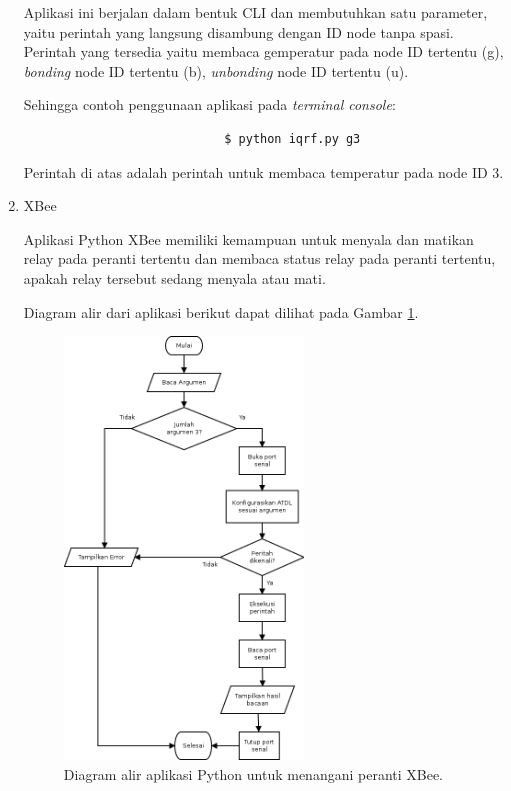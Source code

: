 \begin{enumerate}
					Aplikasi ini berjalan dalam bentuk CLI dan membutuhkan satu parameter, yaitu perintah yang langsung disambung dengan ID node tanpa spasi. Perintah yang tersedia yaitu membaca gemperatur pada node ID tertentu (g), \emph{bonding} node ID tertentu (b), \emph{unbonding} node ID tertentu (u).

					Sehingga contoh penggunaan aplikasi pada \emph{terminal console}:
					\begingroup
					    \fontsize{10pt}{12pt}\selectfont
					    \begin{verbatim}
							$ python iqrf.py g3
					    \end{verbatim}  
					\endgroup
					Perintah di atas adalah perintah untuk membaca temperatur pada node ID 3.

				\item XBee

					Aplikasi Python XBee memiliki kemampuan untuk menyala dan matikan relay pada peranti tertentu dan membaca status relay pada peranti tertentu, apakah relay tersebut sedang menyala atau mati.

					Diagram alir dari aplikasi berikut dapat dilihat pada Gambar \ref{python-xbee}.

					\begin{figure}[H]
					  \centering
					    \includegraphics[width=0.6\textwidth]{gambar/python-xbee}
					    \caption{Diagram alir aplikasi Python untuk menangani peranti XBee.}
					    \label{python-xbee}
					\end{figure}


\end{enumerate}
